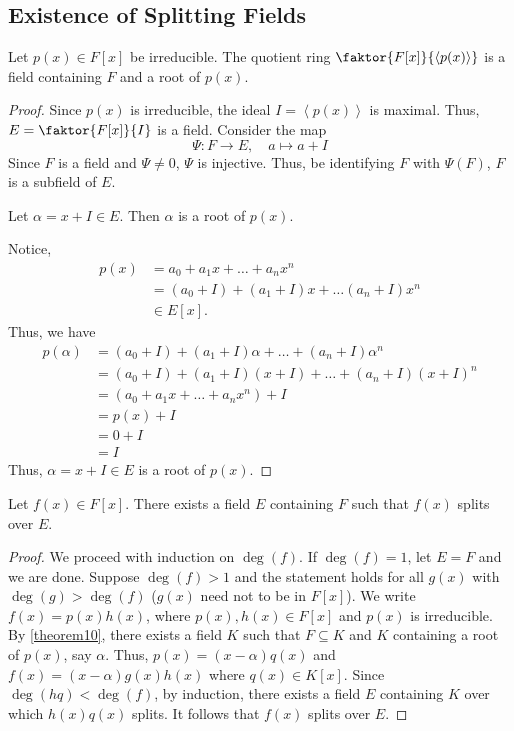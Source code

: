 \documentclass[11pt]{article}
\newcommand{\cyclic}[1]{\left\langle #1 \right\rangle}
\newcommand{\quotient}[2]{\faktor{#1}{#2}}
\begin{document}
\subsection{Existence of Splitting Fields}
\begin{theorem}
Let $p(x) \in F[x]$ be irreducible. The quotient ring
$\quotient{F[x]}{\cyclic{p(x)}}$ is a field containing $F$ and a root of
$p(x)$.
\label{theorem10}
\end{theorem}
\begin{proof}
Since $p(x)$ is irreducible, the ideal $I = \cyclic{p(x)}$ is maximal. Thus,
$E = \quotient{F[x]}{I}$ is a field. Consider the map
\begin{equation*}
\Psi:F\to E, \quad a \mapsto a + I
\end{equation*}
Since $F$ is a field and $\Psi \neq 0$, $\Psi$ is injective. Thus, be
identifying $F$ with $\Psi(F)$, $F$ is a subfield of $E$.
\begin{claim}
Let $\alpha = x + I \in E$. Then $\alpha$ is a root of $p(x)$.
\end{claim}
Notice,
\begin{align*}
p(x) &= a_0 + a_1x + \dots + a_nx^n\\
&= (a_0 + I) + (a_1 + I)x + \dots (a_n + I)x^n\\
&\in E[x].
\end{align*}
Thus, we have
\begin{align*}
p(\alpha) &= (a_0 + I) + (a_1 + I)\alpha + \dots + (a_n + I)\alpha^n\\
&= (a_0 + I) + (a_1 + I)(x+I) + \dots + (a_n + I)(x+I)^n\\
&= (a_0 + a_1x + \dots + a_nx^n) + I \tag{since $(x+I)^i = x^i + I$}\\
&= p(x) + I\\
&= 0 + I\\
&= I
\end{align*}
Thus, $\alpha = x+I \in E$ is a root of $p(x)$.
\end{proof}
\begin{theorem} [Kronecker]
Let $f(x) \in F[x]$. There exists a field $E$ containing $F$ such that
$f(x)$ splits over $E$.
\label{theorem11}
\end{theorem}
\begin{proof}
We proceed with induction on $\deg(f)$. If $\deg(f) = 1$, let $E=F$ and we are
done. Suppose $\deg(f)>1$ and the statement holds for all $g(x)$ with
$\deg(g) > \deg(f)$ ($g(x)$ need not to be in $F[x]$). We write $f(x) =
p(x)h(x)$, where $p(x),h(x) \in F[x]$ and $p(x)$ is irreducible. By
\cref{theorem10}, there exists a field $K$ such that $F \subseteq K$ and $K$
containing a root of $p(x)$, say $\alpha$. Thus, $p(x) = (x-\alpha)q(x)$ and
$f(x) = (x-\alpha)g(x)h(x)$ where $q(x) \in K[x]$. Since $\deg(hq) <
\deg(f)$, by induction, there exists a field $E$ containing $K$ over which
$h(x)q(x)$ splits. It follows that $f(x)$ splits over $E$. 
\end{proof}
\end{document}
